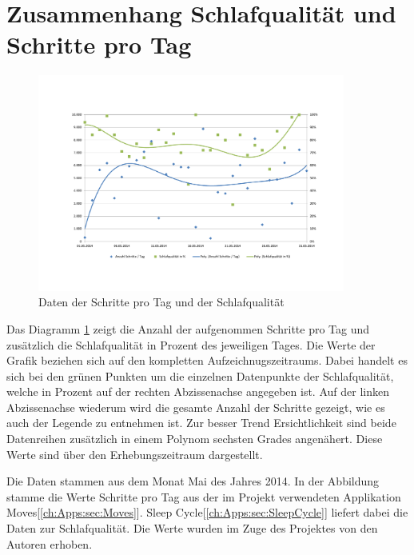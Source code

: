 \section{Zusammenhang Schlafqualität und Schritte pro Tag}
\label{ch:AnalyseUndEvaluierung:sec:ZusammenhangSchlafqualitätProSchrittenAmTag}

\begin{figure}[H]
\centering
        \includegraphics[angle=270,width=0.9\textwidth]{images/Analyse/Sleep-Steps} 
        \caption[Daten der Schritte pro Tag und der Schlafqualität]{Daten der Schritte pro Tag und der Schlafqualität}
        \label{fig:ZusammenhangSchlafqualitätProSchrittenAmTag}
\end{figure}

Das Diagramm \ref{fig:ZusammenhangSchlafqualitätProSchrittenAmTag} zeigt die Anzahl der aufgenommen Schritte pro Tag und zusätzlich die Schlafqualität in Prozent des jeweiligen Tages.
Die Werte der Grafik beziehen sich auf den kompletten Aufzeichnugszeitraums. 
Dabei handelt es sich bei den grünen Punkten um die einzelnen Datenpunkte der Schlafqualität, welche in Prozent auf der rechten Abzissenachse angegeben ist.
Auf der linken Abzissenachse wiederum wird die gesamte Anzahl der Schritte gezeigt, wie es auch der Legende zu entnehmen ist.
Zur besser Trend Ersichtlichkeit sind beide Datenreihen zusätzlich in einem Polynom sechsten Grades angenähert.
Diese Werte sind über den Erhebungszeitraum dargestellt.

Die Daten stammen aus dem Monat Mai des Jahres 2014.
In der Abbildung stamme die Werte Schritte pro Tag aus der im Projekt verwendeten Applikation Moves[\ref{ch:Apps:sec:Moves}]. 
Sleep Cycle[\ref{ch:Apps:sec:SleepCycle}] liefert dabei die Daten zur Schlafqualität.
Die Werte wurden im Zuge des Projektes von den Autoren erhoben.



